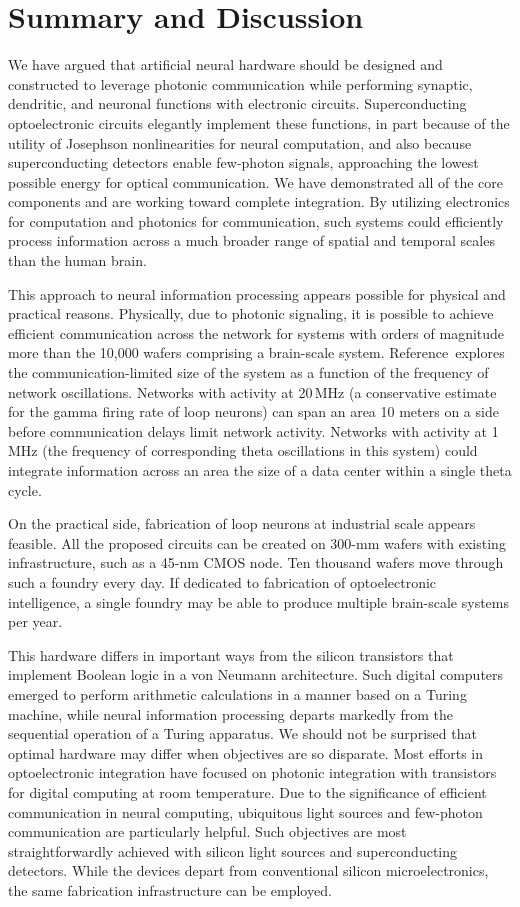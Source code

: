 \documentclass[twocolumn]{article}
\newcommand{\onlinecite}[1]{\hspace{-1 ex} \nocite{#1}\citenum{#1}}
\begin{document}
\section{\label{sec:discussion}Summary and Discussion}
We have argued that artificial neural hardware should be designed and constructed to leverage photonic communication while performing synaptic, dendritic, and neuronal functions with electronic circuits. Superconducting optoelectronic circuits elegantly implement these functions, in part because of the utility of Josephson nonlinearities for neural computation, and also because superconducting detectors enable few-photon signals, approaching the lowest possible energy for optical communication. We have demonstrated all of the core components and are working toward complete integration. By utilizing electronics for computation and photonics for communication, such systems could efficiently process information across a much broader range of spatial and temporal scales than the human brain.

This approach to neural information processing appears possible for physical and practical reasons. Physically, due to photonic signaling, it is possible to achieve efficient communication across the network for systems with orders of magnitude more than the 10,000 wafers comprising a brain-scale system. Reference\,\onlinecite{sh2018_ICRC} explores the communication-limited size of the system as a function of the frequency of network oscillations. Networks with activity at 20\,MHz (a conservative estimate for the gamma firing rate of loop neurons) can span an area 10 meters on a side before communication delays limit network activity. Networks with activity at 1\,MHz (the frequency of corresponding theta oscillations in this system) could integrate information across an area the size of a data center within a single theta cycle.

On the practical side, fabrication of loop neurons at industrial scale appears feasible. All the proposed circuits can be created on 300-mm wafers with existing infrastructure, such as a 45-nm CMOS node. Ten thousand wafers move through such a foundry every day. If dedicated to fabrication of optoelectronic intelligence, a single foundry may be able to produce multiple brain-scale systems per year.

This hardware differs in important ways from the silicon transistors that implement Boolean logic in a von Neumann architecture. Such digital computers emerged to perform arithmetic calculations in a manner based on a Turing machine, while neural information processing departs markedly from the sequential operation of a Turing apparatus. We should not be surprised that optimal hardware may differ when objectives are so disparate. Most efforts in optoelectronic integration have focused on photonic integration with transistors for digital computing at room temperature. Due to the significance of efficient communication in neural computing, ubiquitous light sources and few-photon communication are particularly helpful. Such objectives are most straightforwardly achieved with silicon light sources and superconducting detectors. While the devices depart from conventional silicon microelectronics, the same fabrication infrastructure can be employed. 
\end{document}
